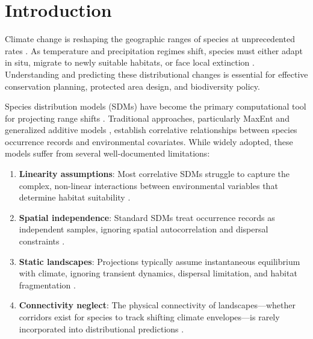 \section{Introduction}

\label{sec:introduction}

Climate change is reshaping the geographic ranges of species at
unprecedented rates \citep{chen2011rapid, pecl2017biodiversity}. As
temperature and precipitation regimes shift, species must either adapt in
situ, migrate to newly suitable habitats, or face local extinction
\citep{urban2015accelerating}. Understanding and predicting these
distributional changes is essential for effective conservation planning,
protected area design, and biodiversity policy.

Species distribution models (SDMs) have become the primary computational
tool for projecting range shifts \citep{elith2009species,
guisan2005predicting}. Traditional approaches, particularly MaxEnt
\citep{phillips2006maximum} and generalized additive models
\citep{hastie1990generalized}, establish correlative relationships between
species occurrence records and environmental covariates. While widely
adopted, these models suffer from several well-documented limitations:

\begin{enumerate}[label=(\roman*)]
  \item \textbf{Linearity assumptions}: Most correlative SDMs struggle to
    capture the complex, non-linear interactions between environmental
    variables that determine habitat suitability
    \citep{elith2006novel}.
  \item \textbf{Spatial independence}: Standard SDMs treat occurrence
    records as independent samples, ignoring spatial autocorrelation and
    dispersal constraints \citep{dormann2007methods}.
  \item \textbf{Static landscapes}: Projections typically assume
    instantaneous equilibrium with climate, ignoring transient dynamics,
    dispersal limitation, and habitat fragmentation
    \citep{zurell2016benchmarking}.
  \item \textbf{Connectivity neglect}: The physical connectivity of
    landscapes---whether corridors exist for species to track shifting
    climate envelopes---is rarely incorporated into distributional
    predictions \citep{hodgson2009climate}.
\end{enumerate}

